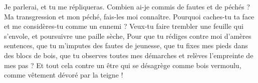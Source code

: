 Je parlerai, et tu me répliqueras.
Combien ai-je commis de fautes et de péchés ? Ma transgression et mon péché, fais-les moi connaître.
Pourquoi caches-tu ta face et me considères-tu comme un ennemi ?
Veux-tu faire trembler une feuille qui s’envole, et poursuivre une paille sèche,
Pour que tu rédiges contre moi d’amères sentences, que tu m’imputes des fautes de jeunesse,
que tu fixes mes pieds dans des blocs de bois, que tu observes toutes mes démarches et relèves l’empreinte de mes pas ?
Et tout cela contre un être qui se désagrège comme bois vermoulu, comme vêtement dévoré par la teigne !